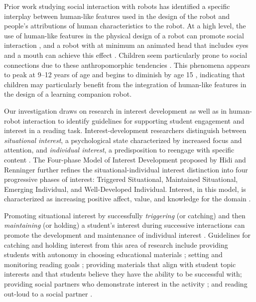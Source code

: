 \documentclass{sigchi}
\begin{document}
Prior work studying social interaction with robots has identified a specific interplay between human-like features used in the design of the robot and people's attributions of human characteristics to the robot. At a high level, the use of human-like features in the physical design of a robot can promote social interaction \cite{Duffy:2003}, and a robot with at minimum an animated head that includes eyes and a mouth can achieve this effect \cite{Martini:2015}. Children seem particularly prone to social connections due to these anthropomorphic tendencies \cite{Tung:2016}. This phenomena appears to peak at 9--12 years of age and begins to diminish by age 15 \cite{Kahn:2012}, indicating that children may particularly benefit from the integration of human-like features in the design of a learning companion robot.

Our investigation draws on research in interest development as well as in human-robot interaction to identify guidelines for supporting student engagement and interest in a reading task. Interest-development researchers distinguish between \textit{situational interest}, a psychological state characterized by increased focus and attention, and \textit{individual interest}, a predisposition to reengage with specific content \cite{Krapp:1999}. The Four-phase Model of Interest Development proposed by Hidi and Renninger \cite{Hidi:2006} further refines the situational-individual interest distinction into four progressive phases of interest: Triggered Situational, Maintained Situational, Emerging Individual, and Well-Developed Individual. Interest, in this model, is characterized as increasing positive affect, value, and knowledge for the domain \cite{Renninger:2011}.

Promoting situational interest by successfully \textit{triggering} (or catching) and then \textit{maintaining} (or holding) a student's interest during successive interactions can promote the development and maintenance of individual interest \cite{Hidi:2006, Mitchell:1993}. Guidelines for catching and holding interest from this area of research include providing students with autonomy in choosing educational materials \cite{Jones:2011}; setting and monitoring reading goals \cite{Cabral:2015}; providing materials that align with student topic interests \cite{Ainley:2002} and that students believe they have the ability to be successful with; providing social partners who demonstrate interest in the activity \cite{Sansone:2005}; and reading out-loud to a social partner \cite{Rasinski:2003}. 
\end{document}
